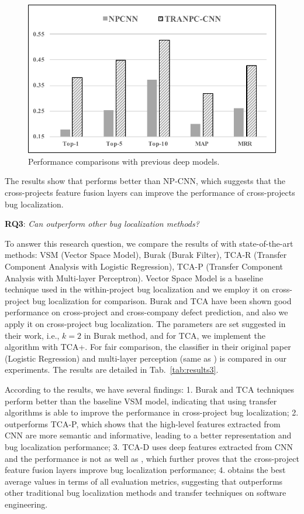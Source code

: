 \begin{figure}[hbt]
\centering
\includegraphics[width = 0.9\columnwidth]{pic/results2.pdf}
\caption{Performance comparisons with previous deep models.}
\label{fig:results2}
\end{figure}

The results show that \TRANPCNN performs better than NP-CNN, which suggests that the cross-projects feature fusion layers can improve the performance of cross-projects bug localization.

\textbf{RQ3}: \textit{Can \TRANPCNN outperform other bug localization methods?}

To answer this research question, we compare the results of \TRANPCNN with state-of-the-art methods: VSM (Vector Space Model), Burak (Burak Filter), TCA-R (Transfer Component Analysis with Logistic Regression), TCA-P (Transfer Component Analysis with Multi-layer Perceptron). Vector Space Model is a baseline technique used in the within-project bug localization and we employ it on cross-project bug localization for comparison. Burak and TCA have been shown good performance on cross-project and cross-company defect prediction, and also we apply it on cross-project bug localization. The parameters are set suggested in their work, i.e., $k=2$ in Burak method, and for TCA, we implement the algorithm with TCA+. For fair comparison, the classifier in their original paper (Logistic Regression) and multi-layer perception (same as \TRANPCNN) is compared in our experiments. The results are detailed in Tab.~\ref{tab:results3}. 

According to the results, we have several findings: 1. Burak and TCA techniques perform better than the baseline VSM model, indicating that using transfer algorithms is able to improve the performance in cross-project bug localization; 2. \TRANPCNN outperforms TCA-P, which shows that the high-level features extracted from CNN are more semantic and informative, leading to a better representation and bug localization performance; 3. TCA-D uses deep features extracted from CNN and the performance is not as well as \TRANPCNN, which further proves that the cross-project feature fusion layers improve bug localization performance; 4. \TRANPCNN obtains the best average values in terms of all evaluation metrics, suggesting that \TRANPCNN outperforms other traditional bug localization methods and transfer techniques on software engineering.

